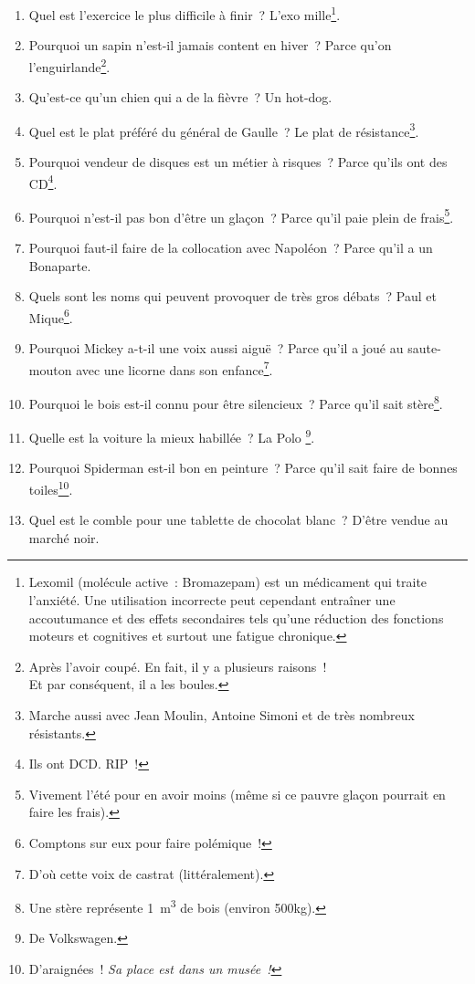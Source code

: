 \documentclass[10pt,a5paper,fullpage]{book}
\begin{document}
\begin{enumerate}
		\item Quel est l'exercice le plus difficile à finir~? L'exo mille\footnote{Lexomil (molécule active~: Bromazepam) est un médicament qui traite l'anxiété. Une utilisation incorrecte peut cependant entraîner une accoutumance et des effets secondaires tels qu'une réduction des fonctions moteurs et cognitives et surtout une fatigue chronique.}. 
		\item Pourquoi un sapin n’est-il jamais content en hiver~? Parce qu’on l’enguirlande\footnote{Après l'avoir coupé. En fait, il y a plusieurs raisons~!\\Et par conséquent, il a les boules.}.
		\item Qu'est-ce qu'un chien qui a de la fièvre~? Un hot-dog. 
		\item Quel est le plat préféré du général de Gaulle~? Le plat de résistance\footnote{Marche aussi avec Jean Moulin, Antoine Simoni et de très nombreux résistants.}.
		\item Pourquoi vendeur de disques est un métier à risques~? Parce qu’ils ont des CD\footnote{Ils ont DCD. RIP~!}.
		\item Pourquoi n’est-il pas bon d’être un glaçon~? Parce qu’il paie plein de frais\footnote{Vivement l'été pour en avoir moins (même si ce pauvre glaçon pourrait en faire les frais).}.
		\item Pourquoi faut-il faire de la collocation avec Napoléon~? Parce qu’il a un Bonaparte.
		\item Quels sont les noms qui peuvent provoquer de très gros débats~? Paul et Mique\footnote{Comptons sur eux pour faire polémique~!}.
		\item Pourquoi Mickey a-t-il une voix aussi aiguë~? Parce qu’il a joué au saute-mouton avec une licorne dans son enfance\footnote{D'où cette voix de castrat (littéralement).}.	
		\item Pourquoi le bois est-il connu pour être silencieux~? Parce qu’il sait stère\footnote{Une stère représente 1~m\textsuperscript{3} de bois (environ 500kg).}.
		\item Quelle est la voiture la mieux habillée~? La Polo \footnote{De Volkswagen.}.
		\item Pourquoi Spiderman est-il bon en peinture~? Parce qu’il sait faire de bonnes toiles\footnote{D'araignées~! \textit{Sa place est dans un musée~!}}.
		\item Quel est le comble pour une tablette de chocolat blanc~? D’être vendue au marché noir. 

\end{enumerate}
\end{document}
